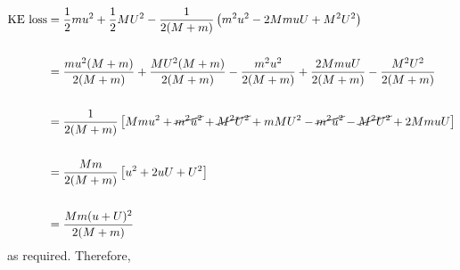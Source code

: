 \begin{problem}
{\begin{eqnarray*} 
\text{KE loss} &= \frac{1}{2}mu^{2} + \frac{1}{2}MU^{2} - \frac{1}{2(M + m)}\left(m^{2}u^{2} - 2MmuU + M^{2}U^{2}\right) \\ \\
	&= \frac{mu^{2}(M + m)}{2(M + m)} + \frac{MU^{2}(M + m)}{2(M + m)} - \frac{m^{2}u^{2}}{2(M + m)} + \frac{2MmuU}{2(M + m)} - \frac{M^{2}U^{2}}{2(M + m)} \\ \\
	&= \frac{1}{2(M + m)}\left[Mmu^{2} + \cancel{m^{2}u^{2}} + \cancel{M^{2}U^{2}} + mMU^{2} - \cancel{m^{2}u^{2}} - \cancel{M^{2}U^{2}} + 2MmuU\right] \\ \\
	&= \frac{Mm}{2(M + m)}\left[u^{2} + 2uU + U^{2}\right] \\ \\
	&= \frac{Mm(u + U)^{2}}{2(M + m)}
\end{eqnarray*} as required.
Therefore, 
}
\end{problem}